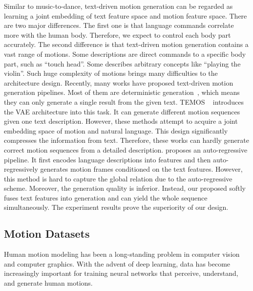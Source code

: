 Similar to music-to-dance, text-driven motion generation can be regarded as learning a joint embedding of text feature space and motion feature space. There are two major differences. The first one is that language commands correlate more with the human body. Therefore, we expect to control each body part accurately. The second difference is that text-driven motion generation contains a vast range of motions. Some descriptions are direct commands to a specific body part, such as ``touch head''. Some describes arbitrary concepts like ``playing the violin''. Such huge complexity of motions brings many difficulties to the architecture design. Recently, many works have proposed text-driven motion generation pipelines. Most of them are deterministic generation~\citep{ahuja2019language2pose,ghosh2021synthesis,tevet2022motionclip}, which means they can only generate a single result from the given text. TEMOS ~\citep{petrovich2022temos} introduces the VAE architecture into this task. It can generate different motion sequences given one text description. However, these methods attempt to acquire a joint embedding space of motion and natural language. This design significantly compresses the information from text. Therefore, these works can hardly generate correct motion sequences from a detailed description. \cite{guo2022generating} proposes an auto-regressive pipeline. It first encodes language descriptions into features and then auto-regressively generates motion frames conditioned on the text features. However, this method is hard to capture the global relation due to the auto-regressive scheme. Moreover, the generation quality is inferior. Instead, our proposed \name softly fuses text features into generation and can yield the whole sequence simultaneously. The experiment results prove the superiority of our design.

\subsection{Motion Datasets}\label{sec2_3}
Human motion modeling has been a long-standing problem in computer vision and computer graphics. With the advent of deep learning, data has become increasingly important for training neural networks that perceive, understand, and generate human motions. 


